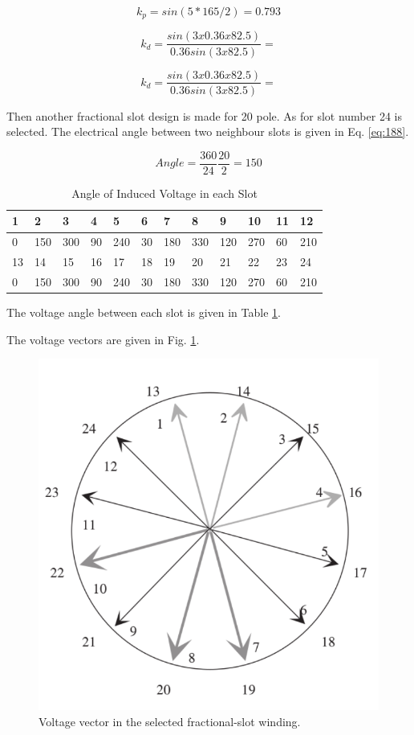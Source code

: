 \documentclass{article}
\begin{document}
\begin{equation}
k_p=sin(5*165/2)= 0.793
\label{eq:kp52022}
\end{equation}

\begin{equation}
k_d=\frac{sin(3x0.36x82.5)}{0.36sin(3x82.5)}=
\label{eq:kd32022}
\end{equation}

\begin{equation}
k_d=\frac{sin(3x0.36x82.5)}{0.36sin(3x82.5)}=
\label{eq:kd52022}
\end{equation}


Then another fractional slot design is made for 20 pole. As for slot number 24 is selected. The electrical angle between two neighbour slots is given in Eq. \ref{eq:188}.

\begin{equation}
Angle=\frac{360}{24}\frac{20}{2}=150
\label{eq:188}
\end{equation}

\begin{table}[H]
	\caption{Angle of Induced Voltage in each Slot}
	\label{tab:voltageangle20-24}
	\begin{tabular}{llllllllllll}
		1	&  2& 3 &4  & 5 & 6 & 7 & 8 & 9 & 10 & 11 & 12 \\
		\hline
		
		0&	150	&300&	90	&240&	30&	180&	330&	120&	270&	60&	210	\\
		\hline
		13	& 14 & 15 &16  &17  &18  &19  &20  &21  &22  &23  &24 \\
			\hline
		0&	150	&300&	90	&240&	30	&180&	330	&120&	270	&60	&210 
	
	\end{tabular}
\end{table}
The voltage angle between each slot is given in Table \ref{tab:voltageangle20-24}.

The voltage vectors are given in Fig. \ref{fig:voltagefrac}.
\begin{figure}[H]
	\centering
	\includegraphics[width=0.7\linewidth]{Figurler/20p24s}
	\caption{Voltage vector in the selected fractional-slot winding.}
	\label{fig:voltagefrac}
\end{figure}
\end{document}
